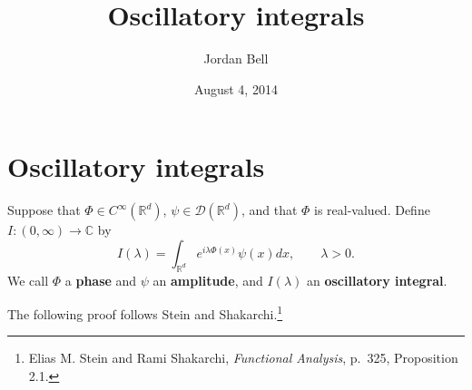 \documentclass{article}
\theoremstyle{definition}
\theoremstyle{definition}
\begin{document}
\title{Oscillatory integrals}
\author{Jordan Bell}
\date{August 4, 2014}

\maketitle

\section{Oscillatory integrals}
Suppose that $\Phi \in C^\infty(\mathbb{R}^d)$, $\psi \in \mathscr{D}(\mathbb{R}^d)$, and that $\Phi$ is real-valued. Define
$I:(0,\infty) \to \mathbb{C}$ 
by
\[
I(\lambda) = \int_{\mathbb{R}^d} e^{i\lambda \Phi(x)} \psi(x) dx, \qquad \lambda>0.
\]
We call $\Phi$ a \textbf{phase} and $\psi$ an \textbf{amplitude}, and $I(\lambda)$ an \textbf{oscillatory integral}.

The following proof follows Stein and Shakarchi.\footnote{Elias
M. Stein and Rami Shakarchi, {\em Functional Analysis}, p.~325, Proposition 2.1.}
\end{document}

